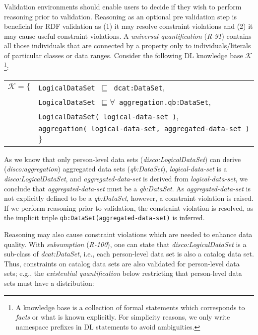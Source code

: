 \documentclass{llncs}
\newcommand{\ms}[1]{\texttt{#1}}
\newenvironment{DL}{
  \vspace{0cm}
	\begin{center}
  \begin{tabular}{c l}

}{
  \end{tabular}
	\end{center}
}
\begin{document}
{Validation environments should enable users to decide if they wish to perform reasoning prior to validation.
Reasoning as an optional pre validation step is beneficial for RDF validation as 
(1) it may resolve constraint violations and  
(2) it may cause useful constraint violations.
A \emph{universal quantification} (\emph{R-91}) contains all those individuals that are connected by a property only to individuals/literals of particular classes  or data ranges.
Consider the following DL knowledge base $\mathcal{K}$\footnote{A knowledge base is a collection of formal statements which corresponds to \emph{facts} or what is known explicitly. For simplicity reasons, we only write namespace prefixes in DL statements to avoid ambiguities.}:

\begin{center}
\begin{DL} 
$\mathcal{K}=\{$ &\ms{LogicalDataSet $\sqsubseteq$ dcat:DataSet},\\
 &\ms{LogicalDataSet $\sqsubseteq \forall$ aggregation.qb:DataSet},\\
 &\ms{LogicalDataSet( logical-data-set )},\\
 &\ms{aggregation( logical-data-set, aggregated-data-set )}
 \}\\ 
\end{DL}
\end{center}

As we know that only person-level data sets (\emph{disco:LogicalDataSet}) can derive (\emph{disco:aggregation}) aggregated data sets (\emph{qb:DataSet}), 
{\em logical-data-set} is a \emph{disco:LogicalDataSet}, 
and \emph{aggregated-data-set} is derived from \emph{logical-data-set},
we conclude that \emph{aggregated-data-set} must be a \emph{qb:DataSet}.
As \emph{aggregated-data-set} is not explicitly defined to be a \emph{qb:DataSet}, however, a constraint violation is raised.
If we perform reasoning prior to validation, the constraint violation is resolved, as the implicit triple \ms{qb:DataSet(aggregated-data-set)} is inferred. 

Reasoning may also cause constraint violations which are needed to enhance data quality.
With \emph{subsumption} (\emph{R-100}), one can state that \emph{disco:LogicalDataSet} is a sub-class of \emph{dcat:DataSet}, 
i.e., each person-level data set is also a catalog data set.
Thus, constraints on catalog data sets are also validated for person-level data sets;
e.g., the \emph{existential quantification} below restricting that person-level data sets must have a distribution: 

}
\end{document}
